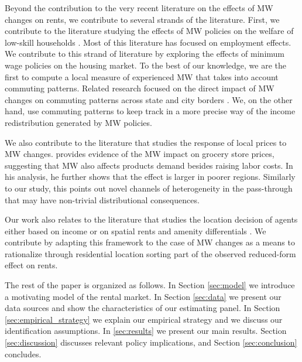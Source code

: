 Beyond the contribution to the very recent literature on the effects of MW changes on 
rents, we contribute to several strands of the literature.
First, we contribute to the literature studying the effects of MW policies on the welfare 
of low-skill households \parencite[][among others]{CardKrueger1994, DinardoEtAl1995, 
Lee1999, Neumark2006, AutorEtAl2016, CegnizEtAl2019}.
Most of this literature has focused on employment effects. We contribute to this 
strand of literature by exploring the effects of minimum wage policies on the housing 
market.
To the best of our knowledge, we are the first to compute a local measure of experienced 
MW that takes into account commuting patterns.
Related research focused on the direct impact of MW changes on commuting patterns across 
state and city borders \parencite{Mckinnish2017, PerezPerez2021}.
We, on the other hand, use commuting patterns to keep track in a more precise way of the 
income redistribution generated by MW policies.

We also contribute to the literature that studies the response of local prices to MW 
changes. \textcite{Leung2021} provides evidence of the MW impact on grocery store prices, 
suggesting that MW also affects products demand besides raising labor costs. In his 
analysis, he further shows that the effect is larger in poorer regions. Similarly to our 
study, this points out novel channels of heterogeneity in the pass-through that may have 
non-trivial distributional consequences.

Our work also relates to the literature that studies the location decision of agents 
either based on income \parencite{Roback1982, Kennan2011, DesmetRossihansberg2013, 
PerezPerez2021, Monras2019} or on spatial rents and amenity differentials 
\parencite{Diamond2016, AlmagroDominguez2019, Couture2019}.
We contribute by adapting this framework to the case of MW changes as a means to 
rationalize through residential location sorting part of the observed reduced-form effect 
on rents. 

The rest of the paper is organized as follows.
In Section \ref{sec:model} we introduce a motivating model of the rental market.
In Section \ref{sec:data} we present our data sources and show the characteristics 
of our estimating panel.
In Section \ref{sec:empirical_strategy} we explain our empirical strategy and
we discuss our identification assumptions.
In \ref{sec:results} we present our main results.
Section \ref{sec:discussion} discusses relevant policy implications, and
Section \ref{sec:conclusion} concludes.
